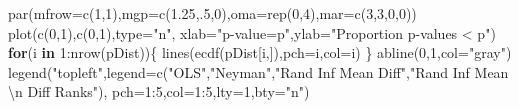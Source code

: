 \documentclass[
]{article}
\newenvironment{Shaded}{\begin{snugshade}}{\end{snugshade}}
\newcommand{\AttributeTok}[1]{\textcolor[rgb]{0.77,0.63,0.00}{#1}}
\newcommand{\ControlFlowTok}[1]{\textcolor[rgb]{0.13,0.29,0.53}{\textbf{#1}}}
\newcommand{\DecValTok}[1]{\textcolor[rgb]{0.00,0.00,0.81}{#1}}
\newcommand{\FloatTok}[1]{\textcolor[rgb]{0.00,0.00,0.81}{#1}}
\newcommand{\FunctionTok}[1]{\textcolor[rgb]{0.00,0.00,0.00}{#1}}
\newcommand{\NormalTok}[1]{#1}
\newcommand{\OtherTok}[1]{\textcolor[rgb]{0.56,0.35,0.01}{#1}}
\newcommand{\SpecialCharTok}[1]{\textcolor[rgb]{0.00,0.00,0.00}{#1}}
\newcommand{\StringTok}[1]{\textcolor[rgb]{0.31,0.60,0.02}{#1}}
\begin{document}
\begin{Shaded}
\end{Shaded}

\begin{Shaded}
\begin{Highlighting}[]
\FunctionTok{par}\NormalTok{(}\AttributeTok{mfrow=}\FunctionTok{c}\NormalTok{(}\DecValTok{1}\NormalTok{,}\DecValTok{1}\NormalTok{),}\AttributeTok{mgp=}\FunctionTok{c}\NormalTok{(}\FloatTok{1.25}\NormalTok{,.}\DecValTok{5}\NormalTok{,}\DecValTok{0}\NormalTok{),}\AttributeTok{oma=}\FunctionTok{rep}\NormalTok{(}\DecValTok{0}\NormalTok{,}\DecValTok{4}\NormalTok{),}\AttributeTok{mar=}\FunctionTok{c}\NormalTok{(}\DecValTok{3}\NormalTok{,}\DecValTok{3}\NormalTok{,}\DecValTok{0}\NormalTok{,}\DecValTok{0}\NormalTok{))}
\FunctionTok{plot}\NormalTok{(}\FunctionTok{c}\NormalTok{(}\DecValTok{0}\NormalTok{,}\DecValTok{1}\NormalTok{),}\FunctionTok{c}\NormalTok{(}\DecValTok{0}\NormalTok{,}\DecValTok{1}\NormalTok{),}\AttributeTok{type=}\StringTok{"n"}\NormalTok{,}
     \AttributeTok{xlab=}\StringTok{"p{-}value=p"}\NormalTok{,}\AttributeTok{ylab=}\StringTok{"Proportion p{-}values \textless{} p"}\NormalTok{)}
\ControlFlowTok{for}\NormalTok{(i }\ControlFlowTok{in} \DecValTok{1}\SpecialCharTok{:}\FunctionTok{nrow}\NormalTok{(pDist))\{}
    \FunctionTok{lines}\NormalTok{(}\FunctionTok{ecdf}\NormalTok{(pDist[i,]),}\AttributeTok{pch=}\NormalTok{i,}\AttributeTok{col=}\NormalTok{i)}
\NormalTok{\}}
\FunctionTok{abline}\NormalTok{(}\DecValTok{0}\NormalTok{,}\DecValTok{1}\NormalTok{,}\AttributeTok{col=}\StringTok{"gray"}\NormalTok{)}
\FunctionTok{legend}\NormalTok{(}\StringTok{"topleft"}\NormalTok{,}\AttributeTok{legend=}\FunctionTok{c}\NormalTok{(}\StringTok{"OLS"}\NormalTok{,}\StringTok{"Neyman"}\NormalTok{,}\StringTok{"Rand Inf Mean Diff"}\NormalTok{,}\StringTok{"Rand Inf Mean }\SpecialCharTok{\textbackslash{}n}\StringTok{ Diff Ranks"}\NormalTok{),}
              \AttributeTok{pch=}\DecValTok{1}\SpecialCharTok{:}\DecValTok{5}\NormalTok{,}\AttributeTok{col=}\DecValTok{1}\SpecialCharTok{:}\DecValTok{5}\NormalTok{,}\AttributeTok{lty=}\DecValTok{1}\NormalTok{,}\AttributeTok{bty=}\StringTok{"n"}\NormalTok{)}
\end{Highlighting}
\end{Shaded}
\end{document}
